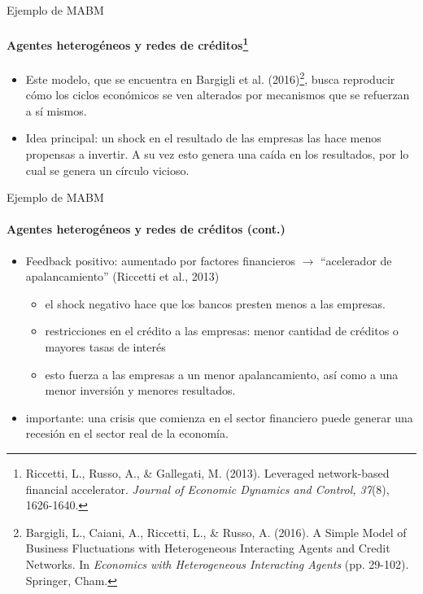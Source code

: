\documentclass[11pt]{beamer}
\begin{document}
\begin{frame}{Ejemplo de MABM}
\framesubtitle{Agentes heterogéneos y redes de créditos\footnote{Riccetti, L., Russo, A., \& Gallegati, M. (2013). Leveraged network-based financial accelerator. \textit{Journal of Economic Dynamics and Control, 37}(8), 1626-1640.}}
\begin{itemize}
    \item Este modelo, que se encuentra en Bargigli et al. (2016)\footnote{Bargigli, L., Caiani, A., Riccetti, L., \& Russo, A. (2016). A Simple Model of Business Fluctuations with Heterogeneous Interacting Agents and Credit Networks. In \textit{Economics with Heterogeneous Interacting Agents} (pp. 29-102). Springer, Cham.}, busca reproducir cómo los ciclos económicos se ven alterados por mecanismos que se refuerzan a sí mismos.
    \item Idea principal: un shock en el resultado de las empresas las hace menos propensas a invertir. A su vez esto genera una caída en los resultados, por lo cual se genera un círculo vicioso.
\end{itemize}
\end{frame}

\begin{frame}{Ejemplo de MABM}
\framesubtitle{Agentes heterogéneos y redes de créditos (cont.)}
\begin{itemize}
    \item Feedback positivo: aumentado por factores financieros $\rightarrow$  ``acelerador de apalancamiento'' (Riccetti et al., 2013)
    \begin{itemize}
        \item el shock negativo hace que los bancos presten menos a las empresas.
        \item restricciones en el crédito a las empresas: menor cantidad de créditos o mayores tasas de interés
        \item esto fuerza a las empresas a un menor apalancamiento, así como a una menor inversión y menores resultados.
    \end{itemize}
    \item importante: una crisis que comienza en el sector financiero puede generar una recesión en el sector real de la economía.
\end{itemize}
\end{frame}
\end{document}
